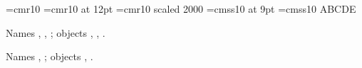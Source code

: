 \documentclass{article}
\begin{document}
\font\fa=cmr10 \font\fb=cmr10 at 12pt \font\fc=cmr10 scaled 2000
\font\fd=cmss10 at 9pt \font\fe=cmss10
{\fa A}{\fb B}{\fc C}{\fd D}{\fe E}

Names \pdffontname\fb, \pdffontname\fa, \pdffontname\fc;
objects \pdffontobjnum\fb, \pdffontobjnum\fa, \pdffontobjnum\fc.

Names \pdffontname\fd, \pdffontname\fe;
objects \pdffontobjnum\fe, \pdffontobjnum\fd.
\end{document}
